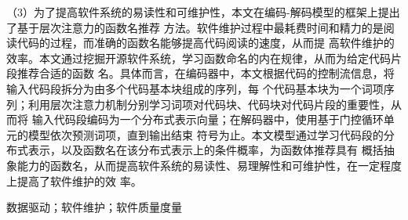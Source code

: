 \begin{zhaiyao}
（3）为了提高软件系统的易读性和可维护性，本文在编码-解码模型的框架上提出了基于层次注意力的函数名推荐
方法。软件维护过程中最耗费时间和精力的是阅读代码的过程，而准确的函数名能够提高代码阅读的速度，从而提
高软件维护的效率。本文通过挖掘开源软件系统，学习函数命名的内在规律，从而为给定代码片段推荐合适的函数
名。具体而言，在编码器中，本文根据代码的控制流信息，将输入代码段拆分为由多个代码基本块组成的序列，每
个代码基本块为一个词项序列；利用层次注意力机制分别学习词项对代码块、代码块对代码片段的重要性，从而将
输入代码段编码为一个分布式表示向量；在解码器中，使用基于门控循环单元的模型依次预测词项，直到输出结束
符号为止。本文模型通过学习代码段的分布式表示，以及函数名在该分布式表示上的条件概率，为函数体推荐具有
概括抽象能力的函数名，从而提高软件系统的易读性、易理解性和可维护性，在一定程度上提高了软件维护的效
率。
\end{zhaiyao}




\begin{guanjianci}
	数据驱动；软件维护；软件质量度量
\end{guanjianci}



